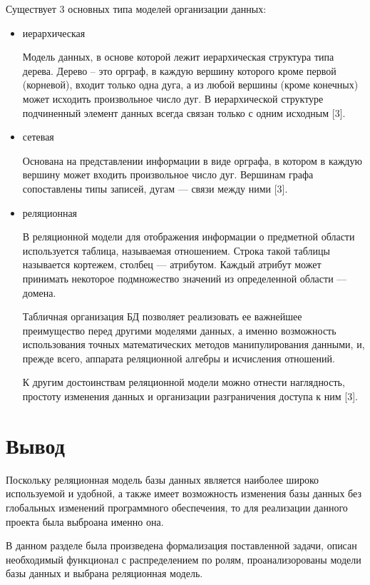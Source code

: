 Существует 3 основных типа моделей организации данных:
\begin{itemize}
	\item иерархическая
	
Модель данных, в основе которой лежит иерархическая структура типа дерева. Дерево – это орграф, в каждую вершину которого кроме первой (корневой), входит только одна дуга, а из любой вершины (кроме конечных) может исходить произвольное число дуг. В иерархической структуре подчиненный элемент данных всегда связан только с одним исходным [3]. 
	\item сетевая
	
Основана на представлении информации в виде орграфа, в котором в каждую вершину может входить произвольное число дуг. Вершинам графа сопоставлены типы записей, дугам --- связи между ними [3].
	\item реляционная
	
В реляционной модели для отображения информации о предметной
области используется таблица, называемая отношением. Строка такой таблицы называется кортежем, столбец --- атрибутом. Каждый атрибут может принимать некоторое подмножество значений из определенной области --- домена.

Табличная организация БД позволяет реализовать ее важнейшее преимущество перед другими моделями данных, а именно возможность использования точных математических методов манипулирования данными,
и, прежде всего, аппарата реляционной алгебры и исчисления отношений.

К другим достоинствам реляционной модели можно отнести наглядность,
простоту изменения данных и организации разграничения доступа к ним [3]. 
\end{itemize}

\section*{Вывод}

Поскольку реляционная модель базы данных является наиболее широко используемой и удобной, а также имеет возможность изменения базы данных без глобальных изменений программного обеспечения, то для реализации данного проекта была выброана именно она.

В данном разделе была произведена формализация поставленной задачи, описан необходимый функционал с распределением по ролям, проанализорованы модели базы данных и выбрана реляционная модель.